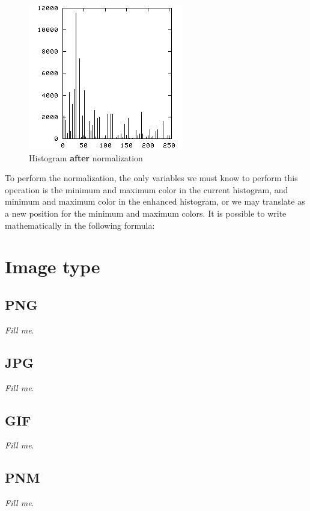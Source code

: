 \documentclass{article}
\begin{document}
		\begin{figure} [H]
			\centering
			\includegraphics[scale=0.5]{images/histogram_2}
			\caption{Histogram \textbf{after} normalization\label{histogram_2}}
		\end{figure}

		To perform the normalization, the only variables we must know to perform this operation is the minimum and maximum color in the current histogram, 
		and minimum and maximum color in the enhanced histogram, or we may translate as a new position for the minimum and maximum colors. It is possible
		to write mathematically in the following formula:
		
		
		
\section{Image type}

	\subsection{PNG}

		\textit{Fill me}.

	\subsection{JPG}

		\textit{Fill me}.

	\subsection{GIF}

		\textit{Fill me}.

	\subsection{PNM}

		\textit{Fill me}.
\end{document}

